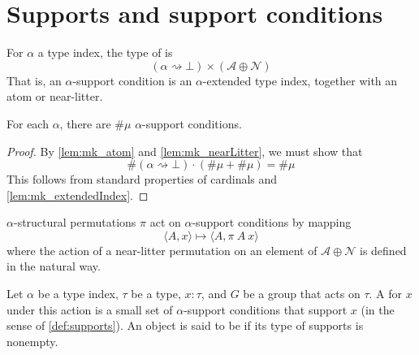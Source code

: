 \section{Supports and support conditions}

\begin{definition}
    For \( \alpha \) a type index, the type of  is
    \[ (\alpha \rightsquigarrow \bot) \times (\mathcal A \oplus \mathcal N) \]
    That is, an \( \alpha \)-support condition is an \( \alpha \)-extended type index, together with an atom or near-litter.
\end{definition}
\begin{lemma}
    \label{lem:mk_supportCondition}
    For each \( \alpha \), there are \( \#\mu \) \( \alpha \)-support conditions.
\end{lemma}
\begin{proof}
    By \cref{lem:mk_atom} and \cref{lem:mk_nearLitter}, we must show that
    \[ \#(\alpha \rightsquigarrow \bot) \cdot (\#\mu + \#\mu) = \#\mu \]
    This follows from standard properties of cardinals and \cref{lem:mk_extendedIndex}.
\end{proof}
\begin{definition}
    \( \alpha \)-structural permutations \( \pi \) act on \( \alpha \)-support conditions by mapping
    \[ \langle A, x \rangle \mapsto \langle A, \pi\ A\ x \rangle \]
    where the action of a near-litter permutation on an element of \( \mathcal A \oplus \mathcal N \) is defined in the natural way.
\end{definition}
\begin{definition}
    Let \( \alpha \) be a type index, \( \tau \) be a type, \( x : \tau \), and \( G \) be a group that acts on \( \tau \).
    A  for \( x \) under this action is a small set of \( \alpha \)-support conditions that support \( x \) (in the sense of \cref{def:supports}).
    An object is said to be  if its type of supports is nonempty.
\end{definition}

